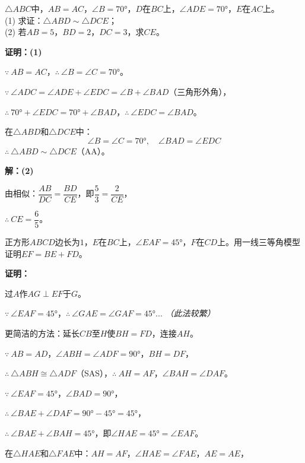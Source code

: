 \documentclass[12pt, a4paper]{ctexart}
\begin{document}
\begin{examplebox}[【例题5】等腰三角形中的一线三等角]
$\triangle ABC$中，$AB = AC$，$\angle B = 70°$，$D$在$BC$上，$\angle ADE = 70°$，$E$在$AC$上。\\
(1) 求证：$\triangle ABD \sim \triangle DCE$；\\
(2) 若$AB = 5$，$BD = 2$，$DC = 3$，求$CE$。
\end{examplebox}

\textbf{证明：(1)}

$\because\ AB = AC$，$\therefore\ \angle B = \angle C = 70°$。

$\because\ \angle ADC = \angle ADE + \angle EDC = \angle B + \angle BAD$（三角形外角），

$\therefore\ 70° + \angle EDC = 70° + \angle BAD$，$\therefore\ \angle EDC = \angle BAD$。

在$\triangle ABD$和$\triangle DCE$中：
\[
\angle B = \angle C = 70°,\quad \angle BAD = \angle EDC
\]
$\therefore\ \triangle ABD \sim \triangle DCE$（AA）。

\textbf{解：(2)}

由相似：$\dfrac{AB}{DC} = \dfrac{BD}{CE}$，即$\dfrac{5}{3} = \dfrac{2}{CE}$，

$\therefore\ CE = \boxed{\dfrac{6}{5}}$。

\begin{examplebox}[【例题6】正方形中的一线三等角]
正方形$ABCD$边长为$1$，$E$在$BC$上，$\angle EAF = 45°$，$F$在$CD$上。用一线三等角模型证明$EF = BE + FD$。
\end{examplebox}

\textbf{证明：}

过$A$作$AG \perp EF$于$G$。

$\because\ \angle EAF = 45°$，$\therefore\ \angle GAE = \angle GAF = 45°$... \textit{（此法较繁）}

更简洁的方法：延长$CB$至$H$使$BH = FD$，连接$AH$。

$\because\ AB = AD$，$\angle ABH = \angle ADF = 90°$，$BH = DF$，

$\therefore\ \triangle ABH \cong \triangle ADF$（SAS），$\therefore\ AH = AF$，$\angle BAH = \angle DAF$。

$\because\ \angle EAF = 45°$，$\angle BAD = 90°$，

$\therefore\ \angle BAE + \angle DAF = 90° - 45° = 45°$，

$\therefore\ \angle BAE + \angle BAH = 45°$，即$\angle HAE = 45° = \angle EAF$。

在$\triangle HAE$和$\triangle FAE$中：$AH = AF$，$\angle HAE = \angle FAE$，$AE = AE$，
\end{document}

